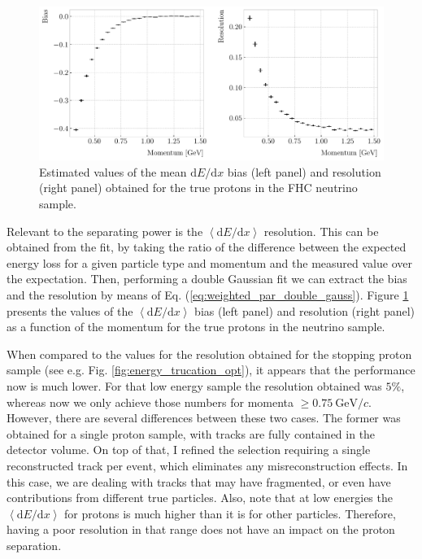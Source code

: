 \begin{figure}[t]
	\centering
	\includegraphics[width=.90\linewidth]{Images/GArSoft_PID/dEdx/proton_dEdx_momentum.pdf}
	\caption[Estimated values of the mean $\mathrm{d}E/\mathrm{d}x$ bias and resolution obtained for the true protons in a FHC neutrino sample.]{Estimated values of the mean $\mathrm{d}E/\mathrm{d}x$ bias (left panel) and resolution (right panel) obtained for the true protons in the FHC neutrino sample.}
	\label{fig:proton_dEdx_momentum}
\end{figure}

Relevant to the separating power is the $\left<\mathrm{d}E/\mathrm{d}x\right>$ resolution. This can be obtained from the fit, by taking the ratio of the difference between the expected energy loss for a given particle type and momentum and the measured value over the expectation. Then, performing a double Gaussian fit we can extract the bias and the resolution by means of Eq. (\ref{eq:weighted_par_double_gauss}). Figure \ref{fig:proton_dEdx_momentum} presents the values of the $\left<\mathrm{d}E/\mathrm{d}x\right>$ bias (left panel) and resolution (right panel) as a function of the momentum for the true protons in the neutrino sample.

When compared to the values for the resolution obtained for the stopping proton sample (see e.g. Fig. \ref{fig:energy_trucation_opt}), it appears that the performance now is much lower. For that low energy sample the resolution obtained was $5\%$, whereas now we only achieve those numbers for momenta $\geq 0.75~\mathrm{GeV}/c$. However, there are several differences between these two cases. The former was obtained for a single proton sample, with tracks are fully contained in the detector volume. On top of that, I refined the selection requiring a single reconstructed track per event, which eliminates any misreconstruction effects. In this case, we are dealing with tracks that may have fragmented, or even have contributions from different true particles. Also, note that at low energies the $\left<\mathrm{d}E/\mathrm{d}x\right>$ for protons is much higher than it is for other particles. Therefore, having a poor resolution in that range does not have an impact on the proton separation.

